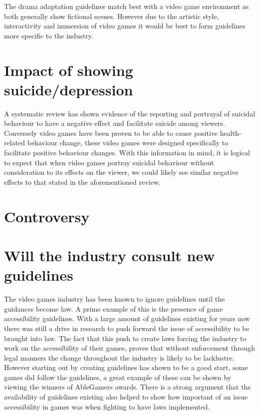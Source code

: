 \documentclass{scrartcl}
\begin{document}
		The drama adaptation guidelines match best with a video game environment as both generally show fictional scenes. However due to the artistic style, interactivity and immersion of video games it would be best to form guidelines more specific to the industry. 	

	\section{Impact of showing suicide/depression}
		A systematic review\cite{pirkis2001suicide} has shown evidence of the reporting and portrayal of suicidal behaviour to have a negative effect and facilitate suicide among viewers. Conversely video games have been proven to be able to cause positive health-related behaviour change\cite{baranowski2008playing}, these video games were designed specifically to facilitate positive behaviour changes. With this information in mind, it is logical to expect that when video games portray suicidal behaviour without consideration to its effects on the viewer, we could likely see similar negative effects to that stated in the aforementioned review\cite{pirkis2001suicide}.
		
	\section{Controversy}
	\section{Will the industry consult new guidelines}
		The video games industry has been known to ignore guidelines until the guidances become law. A prime example of this is the presence of game accessibility  guidelines. With a large amount of guidelines existing for years now\cite{accessGuidelines1}\cite{accessGuidelines2} there was still a drive in research to push forward the issue of accessibility to be brought into law\cite{powers2015video}. The fact that this push to create laws forcing the industry to work on the accessibility of their games, proves that without enforcement through legal manners the change throughout the industry is likely to be lacklustre. However starting out by creating guidelines has shown to be a good start, some games did follow the guidelines, a great example of these can be shown by viewing the winners of AbleGamers awards\cite{ableGamers}. There is a strong argument that the availability of guidelines existing also helped to show how important of an issue accessibility in games was when fighting to have laws implemented.
		
\end{document}
